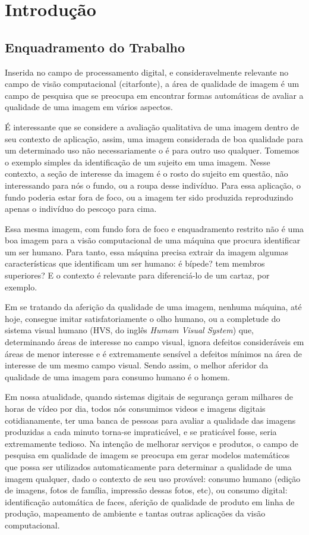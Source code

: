 \documentclass[a4paper]{book}
\begin{document}
\chapter{Introdução}

	\section{Enquadramento do Trabalho}
	Inserida no campo de processamento digital, e consideravelmente relevante no campo de visão computacional (citarfonte), a área de qualidade de imagem é um campo de pesquisa que se preocupa em encontrar formas automáticas de avaliar a qualidade de uma imagem em vários aspectos.

	É interessante que se considere a avaliação qualitativa de uma imagem dentro de seu contexto de aplicação, assim, uma imagem considerada de boa qualidade para um determinado uso não necessariamente o é para outro uso qualquer. Tomemos o exemplo simples da identificação de um sujeito em uma imagem. Nesse contexto, a seção de interesse da imagem é o rosto do sujeito em questão, não interessando para nós o fundo, ou a roupa desse indivíduo. Para essa aplicação, o fundo poderia estar fora de foco, ou a imagem ter sido produzida reproduzindo apenas o indivíduo do pescoço para cima.

	Essa mesma imagem, com fundo fora de foco e enquadramento restrito não é uma boa imagem para a visão computacional de uma máquina que procura identificar um ser humano. Para tanto, essa máquina precisa extrair da imagem algumas características que identificam um ser humano: é bípede? tem membros superiores? E o contexto é relevante para diferenciá-lo de um cartaz, por exemplo.

	Em se tratando da aferição da qualidade de uma imagem, nenhuma máquina, até hoje, consegue imitar satisfatoriamente o olho humano, ou a completude do sistema visual humano (HVS, do inglês {\em Humam Visual System}) que, determinando áreas de interesse no campo visual, ignora defeitos consideráveis em áreas de menor interesse e é extremamente sensível a defeitos mínimos na área de interesse de um mesmo campo visual. Sendo assim, o melhor aferidor da qualidade de uma imagem para consumo humano é o homem.

	Em nossa atualidade, quando sistemas digitais de segurança geram milhares de horas de vídeo por dia, todos nós consumimos videos e imagens digitais cotidianamente, ter uma banca de pessoas para avaliar a qualidade das imagens produzidas a cada minuto torna-se impraticável, e se praticável fosse, seria extremamente tedioso. Na intenção de melhorar serviços e produtos, o campo de pesquisa em qualidade de imagem se preocupa em gerar modelos matemáticos que possa ser utilizados automaticamente para determinar a qualidade de uma imagem qualquer, dado o contexto de seu uso provável: consumo humano (edição de imagens, fotos de família, impressão dessas fotos, etc), ou consumo digital: identificação automática de faces, aferição de qualidade de produto em linha de produção, mapeamento de ambiente e tantas outras aplicações da visão computacional.
\end{document}
